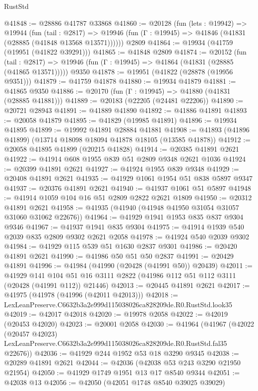 \begin{lexlean}{RustStd}
\begin{coremodule}
@41848 := @28886 @41787 @33868
@41860 := @20128
    (fun (lets : @19942) =>
    @19944
      (fun (tail : @2817) =>
      @19946 (fun (Γ : @19945) => @41846 (@41831 (@28885 (@41848 @13568 @13571))))))
    @2809
@41864 := @19934 (@41759 (@19951 (@41822 @39291)))
@41865 := @41848 @2809
@41874 := @20152
    (fun (tail : @2817) => @19946 (fun (Γ : @19945) => @41864 (@41831 (@28885 (@41865 @13571)))))
    @9350
@41878 := @19951 (@41822 (@28878 (@19956 @9351)))
@41879 := @41759 @41878
@41880 := @19934 @41879
@41881 := @41865 @9350
@41886 := @20170 (fun (Γ : @19945) => @41880 (@41831 (@28885 @41881)))
@41889 := @20183 (@22205 (@24481 @22206))
@41890 := @20721 @28943
@41891 := @41889 @41890
@41892 := @41886 @41891
@41893 := @20058 @41879
@41895 := @41829 (@19985 @41891)
@41896 := @19934 @41895
@41899 := @19992 @41891 @28884 @41881
@41908 := @41893 (@41896 @41899) (@13714 @18098 @18094 @41878 @18105 (@13585 @41878))
@41912 := @20058 @41895 @41899 (@20215 @41828)
@41914 := @20385 @41891 @2621
@41922 := @41914 @608 @1955 @839 @51 @2809 @9348 @2621 @1036
@41924 := @20399 @41891 @2621
@41927 := @41924 @1955 @839 @9348
@41929 := @20408 @41891 @2621
@41935 := @41929 @1061 @1954 @51 @838 @5897 @9347
@41937 := @20376 @41891 @2621
@41940 := @41937 @1061 @51 @5897
@41948 := @41914 @1059 @104 @16 @51 @2809 @2822 @2621 @1809
@41950 := @20312 @41891 @2621
@41958 := @41935 (@41940 (@41948 @41950 @31054 @31057 @31060 @31062 @22676))
@41964 := @41929 @1941 @1953 @835 @837 @9304 @9346
@41967 := @41937 @1941 @835 @9304
@41975 := @41914 @1939 @540 @2039 @835 @2809 @9302 @2621 @2058
@41978 := @41924 @540 @2039 @9302
@41984 := @41929 @115 @539 @51 @1630 @2837 @9301
@41986 := @20420 @41891 @2621
@41990 := @41986 @50 @51 @50 @2837
@41991 := @20429 @41891
@41996 := @41984 (@41990 (@20428 (@41991 @50)) @20439)
@42011 := @41929
    @141
    @104
    @51
    @16
    @3111
    @2822
    (@41986 @112 @51 @112 @3111 (@20428 (@41991 @112)) @21446)
@42013 := @20445 @41891 @2621
@42017 := @41975 (@41978 (@41996 (@42011 @42013)))
@42018 := LexLeanPreserve.C6632b3a2e999d115038026ca828209de.R0.RustStd.look35
@42019 := @42017 @42018
@42020 := @19978 @2058
@42022 := @42019 (@20453 @42020)
@42023 := @20001 @2058
@42030 := @41964
    (@41967
      (@42022
        (@20457 @42023)
        LexLeanPreserve.C6632b3a2e999d115038026ca828209de.R0.RustStd.fal35
        @22676))
@42036 := @41929 @244 @1952 @53 @18 @3290 @9345
@42038 := @20289 @41891 @2621
@42044 := @42036 (@42038 @53 @243 @3290 @21950 @21954)
@42050 := @41929 @1749 @1951 @13 @17 @8540 @9344
@42051 := @42038 @13
@42056 := @42050 (@42051 @1748 @8540 @39025 @39029)

\end{coremodule}
\end{lexlean}
